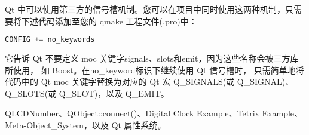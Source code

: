 Qt 中可以使用第三方的信号槽机制。您可以在项目中同时使用这两种机制，只需要将下述代码添加至您的 qmake 工程文件(.pro)中：

\begin{lstlisting}[language=C++]
CONFIG += no_keywords
\end{lstlisting}

它告诉 Qt 不要定义 moc 关键字signals、slots和emit，因为这些名称会被三方库所使用，
如 Boost。在no\_keyword标识下继续使用 Qt 信号槽时，
只需简单地将代码中的 Qt moc 关键字替换为对应的 Qt 宏 Q\_SIGNALS(或 Q\_SIGNAL)、Q\_SLOTS(或 Q\_SLOT)，以及 Q\_EMIT。

\begin{seeAlso}
QLCDNumber、QObject::connect()、Digital Clock Example、Tetrix Example、Meta-Object\_System，以及 Qt 属性系统。
\end{seeAlso}